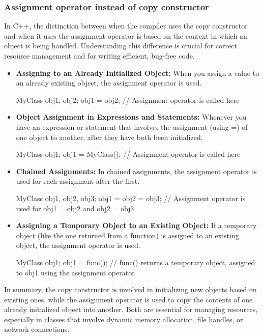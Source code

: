 \documentclass{report}
\begin{document}
    \pagebreak 
    \subsubsection{Assignment operator instead of copy constructor}
    \bigbreak \noindent 
    In C++, the distinction between when the compiler uses the copy constructor and when it uses the assignment operator is based on the context in which an object is being handled. Understanding this difference is crucial for correct resource management and for writing efficient, bug-free code.
    \begin{itemize}
        \item \textbf{Assigning to an Already Initialized Object:} When you assign a value to an already existing object, the assignment operator is used.
            \bigbreak \noindent 
            \begin{cppcode}
            MyClass obj1, obj2;
            obj1 = obj2; // Assignment operator is called here
            \end{cppcode}
        \item \textbf{Object Assignment in Expressions and Statements:} Whenever you have an expression or statement that involves the assignment (using =) of one object to another, after they have both been initialized.
            \bigbreak \noindent 
            \begin{cppcode}
            MyClass obj1;
            obj1 = MyClass(); // Assignment operator is called here
            \end{cppcode}
        \item \textbf{Chained Assignments:} In chained assignments, the assignment operator is used for each assignment after the first.
            \bigbreak \noindent 
            \begin{cppcode}
            MyClass obj1, obj2, obj3;
            obj1 = obj2 = obj3; // Assignment operator is used for obj1 = obj2 and obj2 = obj3
            \end{cppcode}
        \item \textbf{Assigning a Temporary Object to an Existing Object:} If a temporary object (like the one returned from a function) is assigned to an existing object, the assignment operator is used.
            \bigbreak \noindent 
            \begin{cppcode}
            MyClass obj1;
            obj1 = func(); // func() returns a temporary object, assigned to obj1 using the assignment operator
            \end{cppcode}
    \end{itemize}
    \bigbreak \noindent 
    In summary, the copy constructor is involved in initializing new objects based on existing ones, while the assignment operator is used to copy the contents of one already initialized object into another. Both are essential for managing resources, especially in classes that involve dynamic memory allocation, file handles, or network connections.
\end{document}
